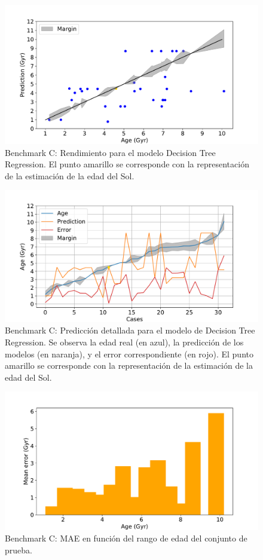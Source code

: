 \begin{figure}[H]
\begin{center}
 \includegraphics[width=0.8\linewidth]{Figuras/Experimentos/B_C_dtr_1.pdf}
\end{center}
\caption{Benchmark C: Rendimiento para el modelo Decision Tree Regression. El punto amarillo se corresponde con la representación de la estimación de la edad del Sol.}
 \label{fig:benchC_details_dtr_1}
\end{figure}

\begin{figure}[H]
\begin{center}
 \includegraphics[width=0.8\linewidth]{Figuras/Experimentos/B_C_dtr_2.pdf}
\end{center}
\caption{Benchmark C: Predicción detallada para el modelo de Decision Tree Regression. Se observa la edad real (en azul), la predicción de los modelos (en naranja), y el error correspondiente (en rojo). El punto amarillo se corresponde con la representación de la estimación de la edad del Sol.}
 \label{fig:benchC_details_dtr_2}
\end{figure}

\begin{figure}[H]
\begin{center}
 \includegraphics[width=0.8\linewidth]{Figuras/Experimentos/B_C_dtr_3.pdf}
\end{center}
\caption{Benchmark C: MAE en función del rango de edad del conjunto de prueba.}
 \label{fig:benchC_details_dtr_3}
\end{figure}

